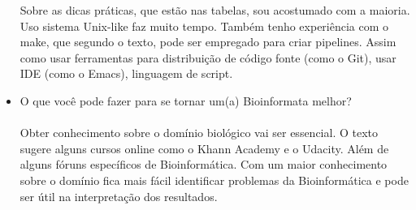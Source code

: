 \documentclass[a4paper, 12pt]{article}
\begin{document}
\begin{itemize}
  Sobre as dicas práticas, que estão nas tabelas, sou acostumado com a maioria. Uso sistema Unix-like faz muito tempo. Também tenho experiência com o make, que segundo o texto, pode ser empregado para  criar pipelines. Assim como usar ferramentas para distribuição de código fonte (como o Git), usar IDE (como o Emacs), linguagem de script. 
\item O que você pode fazer para se tornar um(a) Bioinformata melhor? \\\\
  Obter conhecimento sobre o domínio biológico vai ser essencial. O texto sugere alguns cursos online como o Khann Academy e o Udacity. Além de alguns fóruns específicos de Bioinformática. Com um maior conhecimento sobre o domínio fica mais fácil identificar problemas da Bioinformática e pode ser útil na interpretação dos resultados.
\end{itemize}
\end{document}
